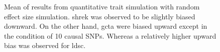\begin{figure}
{				
				\label{fig:ldscInQtRandMean}
			}
			\caption[Quantitative Trait with Random Effect Size Simulation Result(Mean)]
			{Mean of results from quantitative trait simulation with random effect size simulation.
				\gls{shrek} was observed to be slightly biased downward.
				On the other hand, \gls{gcta} were biased upward except in the condition of 10 causal \glspl{SNP}. 
				Whereas a relatively higher upward bias was observed for \gls{ldsc}.} 
			\label{fig:QtRandMean}
		\end{figure}
		
